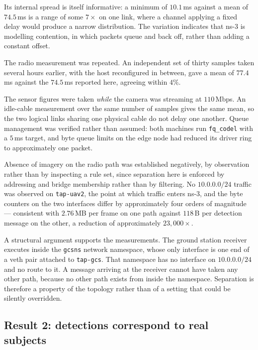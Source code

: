 Its internal spread is itself informative: a minimum of \(10.1\)\,ms against
a mean of \(74.5\)\,ms is a range of some \(7\times\) on one link, where a
channel applying a fixed delay would produce a narrow distribution. The
variation indicates that ns-3 is modelling contention, in which packets queue
and back off, rather than adding a constant offset.

The radio measurement was repeated. An independent set of thirty samples taken
several hours earlier, with the host reconfigured in between, gave a mean of
\(77.4\)\,ms against the \(74.5\)\,ms reported here, agreeing within
\(4\%\).

The sensor figures were taken \emph{while} the camera was streaming at
\(110\)\,Mbps. An idle-cable measurement over the same number of samples
gives the same mean, so the two logical links sharing one physical cable do
not delay one another. Queue management was verified rather than assumed:
both machines run \texttt{fq\_codel} with a \(5\)\,ms target, and byte
queue limits on the edge node had reduced its driver ring to approximately one
packet.

Absence of imagery on the radio path was established negatively, by
observation rather than by inspecting a rule set, since separation here is
enforced by addressing and bridge membership rather than by filtering. No
$10.0.0.0/24$ traffic was observed on \texttt{tap-uav2}, the point at which
traffic enters ns-3, and the byte counters on the two interfaces differ by
approximately four orders of magnitude --- consistent with $2.76$\,MB per
frame on one path against $118$\,B per detection message on the other, a
reduction of approximately \(23{,}000\times\).

A structural argument supports the measurements. The ground station receiver
executes inside the \texttt{gcsns} network namespace, whose only interface
is one end of a veth pair attached to \texttt{tap-gcs}. That namespace has
no interface on $10.0.0.0/24$ and no route to it. A message arriving at the
receiver cannot have taken any other path, because no other path exists from
inside the namespace. Separation is therefore a property of the topology
rather than of a setting that could be silently overridden.

\subsection{Result 2: detections correspond to real subjects}
\label{sec:test-detection}

